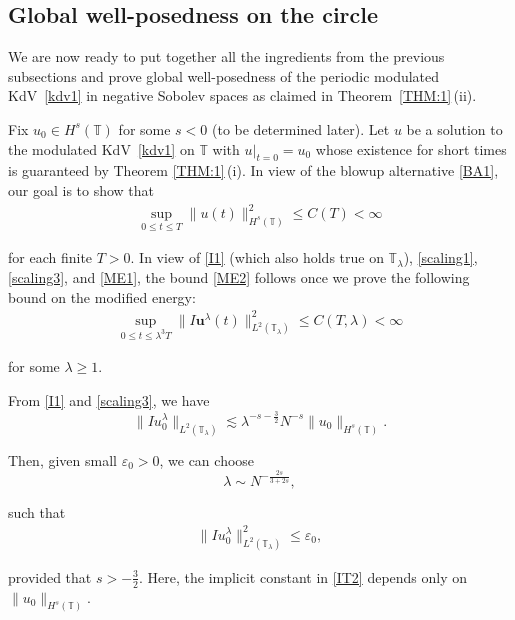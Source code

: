 \documentclass[letterpaper, 11pt,  reqno]{amsart}
\newcommand{\1}{\hspace{0.5mm}\text{I}\hspace{0.5mm}}
\newcommand{\noi}{\noindent}
\newcommand{\T}{\mathbb{T}}
\newcommand{\eps}{\varepsilon}
\newcommand{\ld}{\lambda}
\newcommand{\les}{\lesssim}
\newcommand{\uu}{\mathbf{u}}
\numberwithin{equation}{section}
\numberwithin{theorem}{section}
\begin{document}
\subsection{Global well-posedness on the circle}
\label{SUBSEC:I4}


We are now ready to put  together all the ingredients from the previous subsections
and prove
global well-posedness  
of the periodic modulated KdV~\eqref{kdv1} in negative Sobolev spaces
as  claimed in Theorem~\ref{THM:1}\,(ii).

Fix $u_0 \in H^s(\T)$ for some $s < 0$ (to be determined later).
Let 
 $u$ be a solution to  the modulated KdV~\eqref{kdv1} on $\T$ 
with $u|_{t = 0} = u_0$
whose existence for short times is guaranteed by Theorem \ref{THM:1}\,(i).
In view of the blowup alternative \eqref{BA1}, 
our goal is to show that 
\begin{align}
\sup_{0 \le t \le T} \|u(t)\|_{H^s(\T)}^2 \le C(T) < \infty
\label{ME2}
\end{align}


\noi
for  each finite $T > 0$.
In view of 
 \eqref{I1} (which also holds true on $\T_\ld$), \eqref{scaling1}, \eqref{scaling3}, and \eqref{ME1}, 
the bound \eqref{ME2} follows once we prove the following bound on the modified energy:
\begin{align*}
\sup_{0 \le t \le \ld^3 T} \|I\uu^\ld(t)\|_{L^2(\T_\ld)}^2 \le C(T, \ld ) < \infty
\end{align*}

\noi
for some $\ld \ge 1$.



From \eqref{I1} 
and \eqref{scaling3}, we have 
\begin{equation}
 \| I  u_0^{\ld} \|_{L^2(\T_\ld) }
 \les \ld^{-s-\frac 32} N^{-s} \|  u_0  \|_{H^{s}(\T)}.
 \label{IT1}
\end{equation}


\noi
Then, given small $\eps_0 > 0$, 
we can choose 
\begin{equation}
\ld \sim N^{-\frac{2s}{3+2s}}, 
 \label{IT2}
\end{equation}


\noi
such that 
\begin{align}
\| Iu_0^{\ld} \|^2 _{L^2(\T_\ld)}\le \eps_0, 
\label{IT2a}
\end{align}


\noi
provided that $s > -\frac 32$.
Here, 
 the implicit constant in \eqref{IT2} depends only on ${\| u_0 \|_{H^{s}(\T) }} $.
\end{document}
